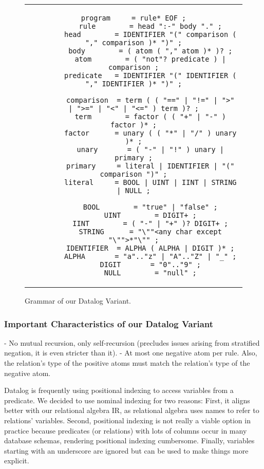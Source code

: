 \begin{figure}[htpb]
	\centering
	\begin{tabular}{c}
		\begin{lstlisting}[]
		program     = rule* EOF ;
		rule        = head ":-" body "." ;
		head        = IDENTIFIER "(" comparison ( "," comparison )* ")" ;
		body        = ( atom ( "," atom )* )? ;
		atom        = ( "not"? predicate ) | comparison ;
		predicate   = IDENTIFIER "(" IDENTIFIER ( "," IDENTIFIER )* ")" ;

		comparison  = term ( ( "==" | "!=" | ">" | ">=" | "<" | "<=" ) term )? ;
		term        = factor ( ( "+" | "-" ) factor )* ;
		factor      = unary ( ( "*" | "/" ) unary )* ;
		unary       = ( "-" | "!" ) unary | primary ;
		primary     = literal | IDENTIFIER | "(" comparison ")" ;
		literal     = BOOL | UINT | IINT | STRING | NULL ;

		BOOL        = "true" | "false" ;
		UINT        = DIGIT+ ;
		IINT        = ( "-" | "+" )? DIGIT+ ;
		STRING      = "\""<any char except "\"">*"\"" ;
		IDENTIFIER  = ALPHA ( ALPHA | DIGIT )* ;
		ALPHA       = "a".."z" | "A".."Z" | "_" ;
		DIGIT       = "0".."9" ;
		NULL        = "null" ;
        \end{lstlisting}
	\end{tabular}
	\caption[Example listing]{Grammar of our Datalog Variant.}\label{code:datalog-grammar}
\end{figure}

\subsubsection{Important Characteristics of our Datalog Variant}

- No mutual recursion, only self-recursion (precludes issues arising from
stratified negation, it is even stricter than it).
- At most one negative atom per rule. Also, the relation's type of the
positive atoms must match the relation's type of the negative atom.

Datalog is frequently using positional indexing to access variables from a
predicate. We decided to use nominal indexing for two reasons:
First, it aligns better with our relational algebra IR,
as relational algebra uses names to refer to relations' variables.
Second, positional indexing is not really a viable option in practice because
predicates (or relations) with lots of columns occur in many database schemas,
rendering positional indexing cumbersome.
Finally, variables starting with an underscore are ignored but can be used
to make things more explicit.

